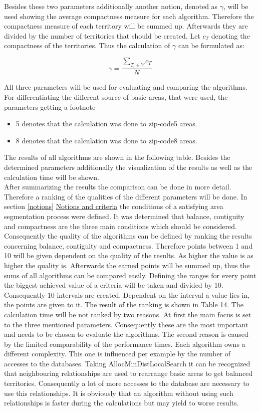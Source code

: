 Besides these two parameters additionally another notion, denoted as $\gamma$, will be used showing the average compactness measure for each algorithm. Therefore the compactness measure of each territory will be summed up. Afterwards they are divided by the number of territories that should be created. Let $c_{T}$ denoting the compactness of the territories. Thus the calculation of $\gamma$ can be formulated as:

\[ \mathit{\gamma  = \frac{\sum\nolimits  _{T_{i} \in V} c_{T}}{N}}\]

All three parameters will be used for evaluating and comparing the algorithms. For 
differentiating the different source of basic areas, that were used, the parameters getting a footnote
 \begin{itemize}
 	\item 5 denotes that the calculation was done to zip-code5 areas.
 	\item 8  denotes that the calculation was done to zip-code8 areas.
 \end{itemize}
 
 The results of all algorithms are shown in the following table. Besides the determined parameters additionally the visualization of the results as well as the calculation time will be shown. \newline
 \\ After summarizing the results the comparison can be done in more detail. Therefore a ranking of the qualities of the different parameters will be done. In section \ref{notions} \hyperref[notions]{Notions and criteria} the conditions of a satisfying area segmentation process were defined. It was determined that balance, contiguity and compactness are the three main conditions which should be considered. Consequently the quality of the algorithms can be defined by ranking the results concerning balance, contiguity and compactness. Therefore points between 1 and 10 will be given dependent on the quality of the results. As higher the value is as higher the quality is. Afterwards the earned points will be summed up, thus the sums of all algorithms can be compared easily. Defining the ranges for every point the biggest achieved value of a criteria will be taken and divided by 10. Consequently 10 intervals are created. Dependent on the interval a value lies in, the points are given to it. The result of the ranking is shown in Table 14. The calculation time will be not ranked by two reasons. At first the main focus is set to the three mentioned parameters. Consequently these are the most important and needs to be chosen to evaluate the algorithms. The second reason is caused by the limited comparability of the performance times. Each algorithm owns a different complexity. This one is influenced per example by the number of accesses to the databases. Taking AllocMinDistLocalSearch it can be recognized that neighbouring relationships are used to rearrange basic areas to get balanced territories. Consequently a lot of more accesses to the database are necessary to use this relationships. It is obviously that an algorithm without using such relationships is faster during the calculations but may yield to worse results. 
 


